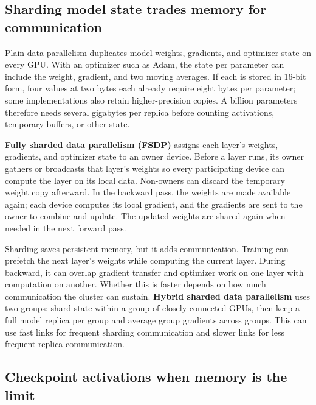 \subsection{Sharding model state trades memory for communication}\label{04-visual-computing-ii-ch031-sharding-model-state-trades-memory-for-communication}

\hypertarget{04-visual-computing-ii-ch031-sharding-model-state-trades-memory-for-communication}{}

Plain data parallelism duplicates model weights, gradients, and optimizer state on every GPU. With an optimizer such as Adam, the state per parameter can include the weight, gradient, and two moving averages. If each is stored in 16-bit form, four values at two bytes each already require eight bytes per parameter; some implementations also retain higher-precision copies. A billion parameters therefore needs several gigabytes per replica before counting activations, temporary buffers, or other state.

\textbf{Fully sharded data parallelism (FSDP)} assigns each layer's weights, gradients, and optimizer state to an owner device. Before a layer runs, its owner gathers or broadcasts that layer's weights so every participating device can compute the layer on its local data. Non-owners can discard the temporary weight copy afterward. In the backward pass, the weights are made available again; each device computes its local gradient, and the gradients are sent to the owner to combine and update. The updated weights are shared again when needed in the next forward pass.

Sharding saves persistent memory, but it adds communication. Training can prefetch the next layer's weights while computing the current layer. During backward, it can overlap gradient transfer and optimizer work on one layer with computation on another. Whether this is faster depends on how much communication the cluster can sustain. \textbf{Hybrid sharded data parallelism} uses two groups: shard state within a group of closely connected GPUs, then keep a full model replica per group and average group gradients across groups. This can use fast links for frequent sharding communication and slower links for less frequent replica communication.

\subsection{Checkpoint activations when memory is the limit}\label{04-visual-computing-ii-ch031-checkpoint-activations-when-memory-is-the-limit}

